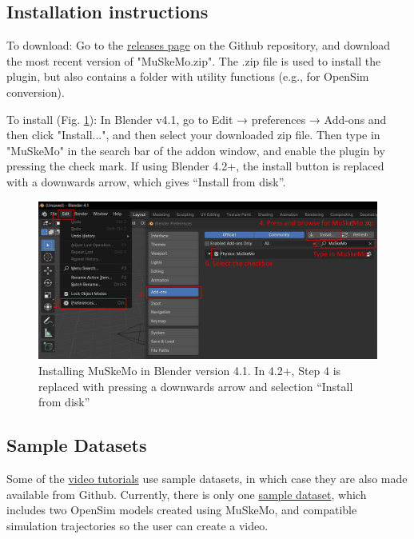 \documentclass{article}
\begin{document}
\subsection{Installation instructions}

To download: Go to the \href{https://github.com/PashavanBijlert/MuSkeMo/releases}{releases page} on the Github repository, and download the most recent version of "MuSkeMo.zip". The .zip file is used to install the plugin, but also contains a folder with utility functions (e.g., for OpenSim conversion).

To install (Fig. \ref{fig:installation}): In Blender v4.1, go to Edit → preferences → Add-ons and then click "Install...", and then select your downloaded zip file. Then type in "MuSkeMo" in the search bar of the addon window, and enable the plugin by pressing the check mark. If using Blender 4.2+, the install button is replaced with a downwards arrow, which gives ``Install from disk''.

\begin{figure}[h]
    \centering
    \includegraphics[width=\textwidth]{figures/install_instructions.png} %
    \caption{Installing MuSkeMo in Blender version 4.1. In 4.2+, Step 4 is replaced with pressing a downwards arrow and selection ``Install from disk''}
    \label{fig:installation}
\end{figure}

\subsection{Sample Datasets}
\label{sec:sampledataset}
Some of the \href{https://youtube.com/playlist?list=PLfgxaucAWlEp5-cavvXmdrTIWYT_tgZYK&si=Cdl9MchuLP5aRJNL}{video tutorials} use sample datasets, in which case they are also made available from Github. Currently, there is only one \href{https://github.com/PashavanBijlert/MuSkeMo/releases/tag/v0.x-sampledataset1}{sample dataset}, which includes two OpenSim models created using MuSkeMo, and compatible simulation trajectories so the user can create a video.
\end{document}
